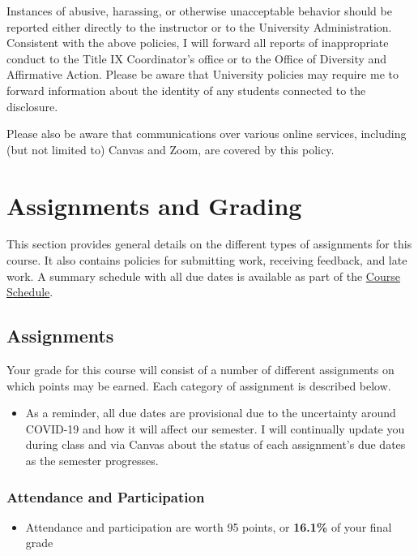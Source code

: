 \documentclass[
]{book}
\newenvironment{rmdblock}[1]
  {\begin{shaded*}
  \begin{itemize}
  \renewcommand{\labelitemi}{
    \raisebox{-.7\height}[0pt][0pt]{
      {\setkeys{Gin}{width=3em,keepaspectratio}\texttt{[image: images/\#1]}}
    }
  }
  \item
  }
  {
  \end{itemize}
  \end{shaded*}
  }
\newenvironment{rmdtip}
  {\begin{rmdblock}{tip}}
  {\end{rmdblock}}
\newenvironment{rmdwarning}
  {\begin{rmdblock}{warning}}
  {\end{rmdblock}}
\begin{document}
Instances of abusive, harassing, or otherwise unacceptable behavior should be reported either directly to the instructor or to the University Administration. Consistent with the above policies, I will forward all reports of inappropriate conduct to the Title IX Coordinator's office or to the Office of Diversity and Affirmative Action. Please be aware that University policies may require me to forward information about the identity of any students connected to the disclosure.

Please also be aware that communications over various online services, including (but not limited to) Canvas and Zoom, are covered by this policy.

\hypertarget{assignments-and-grading}{%
\chapter{Assignments and Grading}\label{assignments-and-grading}}

This section provides general details on the different types of assignments for this course. It also contains policies for submitting work, receiving feedback, and late work. A summary schedule with all due dates is available as part of the \href{course-schedule.html}{Course Schedule}.

\hypertarget{assignments}{%
\section{Assignments}\label{assignments}}

Your grade for this course will consist of a number of different assignments on which points may be earned. Each category of assignment is described below.

\begin{rmdwarning}
As a reminder, all due dates are provisional due to the uncertainty
around COVID-19 and how it will affect our semester. I will continually
update you during class and via Canvas about the status of each
assignment's due dates as the semester progresses.
\end{rmdwarning}

\hypertarget{attendance-and-participation-1}{%
\subsection{Attendance and Participation}\label{attendance-and-participation-1}}

\begin{rmdtip}
Attendance and participation are worth 95 points, or \textbf{16.1\%} of
your final grade
\end{rmdtip}
\end{document}

